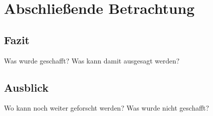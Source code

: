 \chapter{Abschließende Betrachtung}

\section{Fazit}
Was wurde geschafft?
Was kann damit ausgesagt werden?

\section{Ausblick}
Wo kann noch weiter geforscht werden?
Was wurde nicht geschafft?